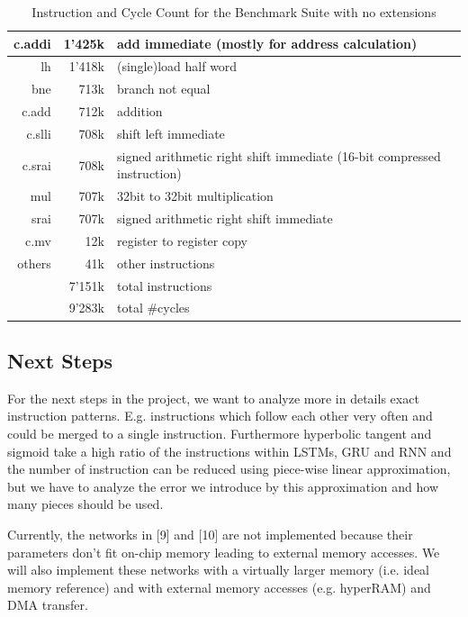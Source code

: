 \begin{table}[h]
\centering
\begin{tabular}{|r|r|l|}
\hline
      c.addi& 1'425k & add immediate (mostly for address calculation) \\ \hline
          lh& 1'418k & (single)load half word \\ \hline
         bne& 713k & branch not equal \\ \hline
       c.add& 712k & addition\\ \hline
      c.slli& 708k & shift left immediate\\ \hline
      c.srai& 708k & signed arithmetic right shift immediate (16-bit compressed instruction) \\ \hline
         mul& 707k & 32bit to 32bit multiplication \\ \hline
        srai& 707k & signed arithmetic right shift immediate \\ \hline
        c.mv&  12k & register to register copy \\ \hline
others & 41k & other instructions \\ \hline\hline
         & 7'151k & total instructions \\ \hline
         & 9'283k & total \#cycles\\ \hline
\end{tabular}
\caption{Instruction and Cycle Count for the Benchmark Suite with no extensions}\label{tab:instr_noopt}
\end{table}




\subsection{Next Steps}
For the next steps in the project, we want to analyze more in details exact instruction patterns. E.g. instructions which follow each other very often and could be merged to a single instruction. Furthermore hyperbolic tangent and sigmoid take a high ratio of the instructions within LSTMs, GRU and RNN and the number of instruction can be reduced using piece-wise linear approximation, but we have to analyze the error we introduce by this approximation and how many pieces should be used.

Currently, the networks in [9] and [10] are not implemented because their parameters don't fit on-chip memory leading to external memory accesses. We will also implement these networks with a virtually larger memory (i.e. ideal memory reference) and with external memory accesses (e.g. hyperRAM) and DMA transfer.

